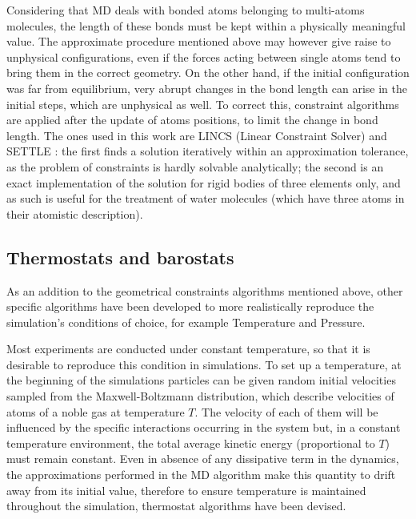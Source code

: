 Considering that MD deals with bonded atoms belonging to multi-atoms molecules, the length of these bonds must be kept within a physically meaningful value. The approximate procedure mentioned above may however give raise to unphysical configurations, even if the forces acting between single atoms tend to bring them in the correct geometry. On the other hand, if the initial configuration was far from equilibrium, very abrupt changes in the bond length can arise in the initial steps, which are unphysical as well.
%
To correct this, constraint algorithms are applied after the update of atoms positions, to limit the change in bond length. The ones used in this work are LINCS (Linear Constraint Solver) \citep{Hess1997} and SETTLE \citep{Miyamoto1992}: the first finds a solution iteratively within an approximation tolerance, as the problem of constraints is hardly solvable analytically; the second is an exact implementation of the solution for rigid bodies of three elements only, and as such is useful for the treatment of water molecules (which have three atoms in their atomistic description).

\subsection{Thermostats and barostats}
As an addition to the geometrical constraints algorithms mentioned above, other specific algorithms have been developed to more realistically reproduce the simulation's conditions of choice, for example Temperature and Pressure.

Most experiments are conducted under constant temperature, so that it is desirable to reproduce this condition in simulations.
%
To set up a temperature, at the beginning of the simulations particles can be given random initial velocities sampled from the Maxwell-Boltzmann distribution, which describe velocities of atoms of a noble gas at temperature $T$. The velocity of each of them will be influenced by the specific interactions occurring in the system but, in a constant temperature environment, the total average kinetic energy (proportional to $T$) must remain constant.
%
Even in absence of any dissipative term in the dynamics, the approximations performed in the MD algorithm make this quantity to drift away from its initial value, therefore to ensure temperature is maintained throughout the simulation, thermostat algorithms have been devised.

